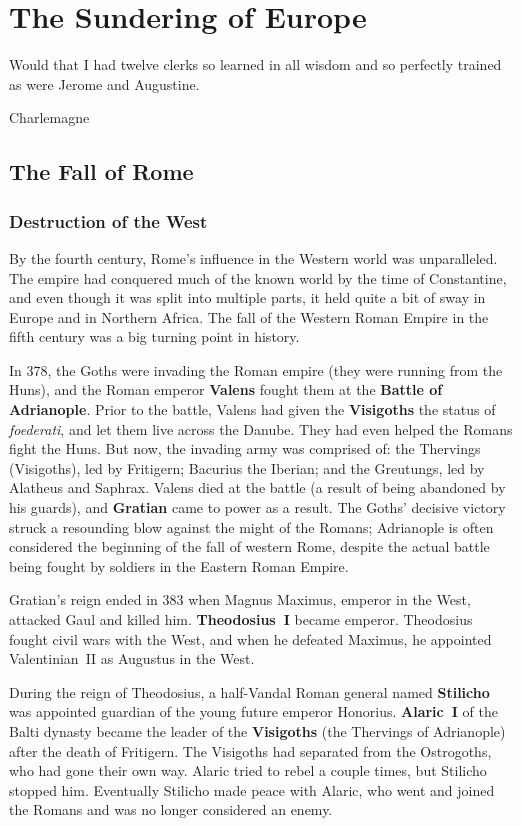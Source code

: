 \chapter{The Sundering of Europe}

\epigraph{%
  Would that I had twelve clerks so learned in all wisdom and so perfectly trained as were Jerome and Augustine.
}{Charlemagne}

\section{The Fall of Rome}

\subsection*{Destruction of the West}

By the fourth century, Rome's influence in the Western world was unparalleled.
The empire had conquered much of the known world by the time of Constantine,
and even though it was split into multiple parts, it held quite a bit of sway
in Europe and in Northern Africa.
The fall of the Western Roman Empire in the fifth century was a big turning point in history.

In 378, the Goths were invading the Roman empire (they were running from the Huns),
and the Roman emperor \textbf{Valens} fought them at the \textbf{Battle of Adrianople}.
Prior to the battle, Valens had given the \textbf{Visigoths} the status of \textit{foederati},
and let them live across the Danube.
They had even helped the Romans fight the Huns.
But now, the invading army was comprised of:
the Thervings (Visigoths), led by Fritigern;
Bacurius the Iberian;
and the Greutungs, led by Alatheus and Saphrax.
Valens died at the battle (a result of being abandoned by his guards),
and \textbf{Gratian} came to power as a result.
The Goths' decisive victory struck a resounding blow against the might of the Romans;
Adrianople is often considered the beginning of the fall of western Rome,
despite the actual battle being fought by soldiers in the Eastern Roman Empire.

Gratian's reign ended in 383 when Magnus Maximus, emperor in the West, attacked Gaul and killed him.
\textbf{Theodosius~I} became emperor.
Theodosius fought civil wars with the West,
and when he defeated Maximus, he appointed Valentinian~II as Augustus in the West.

During the reign of Theodosius, a half-Vandal Roman general named \textbf{Stilicho}
was appointed guardian of the young future emperor Honorius.
\textbf{Alaric~I} of the Balti dynasty became the leader of the \textbf{Visigoths}
(the Thervings of Adrianople)
after the death of Fritigern.
The Visigoths had separated from the Ostrogoths, who had gone their own way.
Alaric tried to rebel a couple times, but Stilicho stopped him.
Eventually Stilicho made peace with Alaric,
who went and joined the Romans and was no longer considered an enemy.

